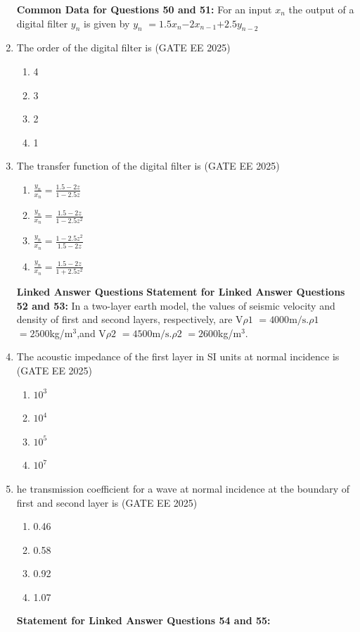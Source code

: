 \documentclass[journal]{IEEEtran}
\begin{document}
\begin{enumerate}[start=26]
\begin{enumerate}
\end{enumerate}
\textbf{Common Data for Questions 50 and 51:}
For an input $x_n$ the output of a digital filter $y_n$ is given by $y_n$ $=1.5$$x_n$$-2$$x_{n-1}$$+     2.5$$y_{n-2}$
\item The order of the digital filter is
\hfill{(GATE EE 2025)}
\begin{enumerate}
    \item  4
    \item 3
\item 2
\item 1 
\end{enumerate}
\item The transfer function of the digital filter is
\hfill{(GATE EE 2025)}
\begin{enumerate}
    \item $\frac{y_n}{x_n}=\frac{1.5-2z}{1-2.5z}$
    \vspace{0.3cm}
    \item $\frac{y_n}{x_n}=\frac{1.5-2z}{1-2.5z^2}$
    \vspace{0.3cm}
    \item  $\frac{y_n}{x_n}=\frac{1-2.5z^2}{1.5-2z}$
    \vspace{0.3cm}
    \item $\frac{y_n}{x_n}=\frac{1.5-2z}{1+2.5z^2}$
\end{enumerate}
\vspace{0.3cm}
\textbf{Linked Answer Questions}
\textbf{Statement for Linked Answer Questions 52 and 53:}
In a two-layer earth model, the values of seismic velocity and density of first and second layers, respectively, are V$\rho 1$ $= 4000 \text{m/s}$.$\rho 1$ $=2500$kg/m$^3$,and  V$\rho 2$ $= 4500 \text{m/s}$.$\rho 2$ $=2600$kg/m$^3$.
\item The acoustic impedance of the first layer in SI units at normal incidence is\\
\hfill{(GATE EE 2025)}
\begin{enumerate}
    \item  $10^3$
\item  $10^4$
\item  $10^5$
\item  $10^7$
\end{enumerate}
\item he transmission coefficient for a wave at normal incidence at the boundary of first and second layer is
\hfill{(GATE EE 2025)}
\begin{enumerate}
    \item  0.46
\item 0.58
\item 0.92
\item  1.07
\end{enumerate}
\textbf{Statement for Linked Answer Questions 54 and 55:}


\end{enumerate}
\end{document}
